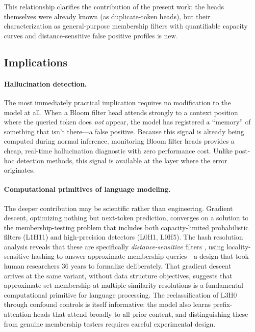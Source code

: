 \documentclass[11pt]{article}
\begin{document}
This relationship clarifies the contribution of the present work: the heads themselves were already known (as duplicate-token heads), but their characterization as general-purpose membership filters with quantifiable capacity curves and distance-sensitive false positive profiles is new.

\subsection{Implications}

\paragraph{Hallucination detection.} The most immediately practical implication requires no modification to the model at all. When a Bloom filter head attends strongly to a context position where the queried token does \emph{not} appear, the model has registered a ``memory'' of something that isn't there---a false positive. Because this signal is already being computed during normal inference, monitoring Bloom filter heads provides a cheap, real-time hallucination diagnostic with zero performance cost. Unlike post-hoc detection methods, this signal is available at the layer where the error originates.

\paragraph{Computational primitives of language modeling.} The deeper contribution may be scientific rather than engineering. Gradient descent, optimizing nothing but next-token prediction, converges on a solution to the membership-testing problem that includes both capacity-limited probabilistic filters (L1H11) and high-precision detectors (L0H1, L0H5). The hash resolution analysis reveals that these are specifically \emph{distance-sensitive} filters \citep{kirsch2006distance}, using locality-sensitive hashing to answer approximate membership queries---a design that took human researchers 36 years to formalize deliberately. That gradient descent arrives at the same variant, without data structure objectives, suggests that approximate set membership at multiple similarity resolutions is a fundamental computational primitive for language processing. The reclassification of L3H0 through confound controls is itself informative: the model also learns prefix-attention heads that attend broadly to all prior content, and distinguishing these from genuine membership testers requires careful experimental design.
\end{document}
